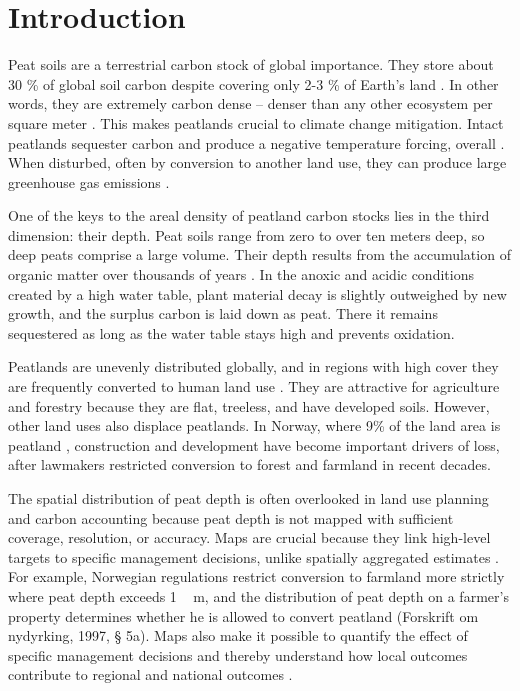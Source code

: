 \documentclass[soil, manuscript]{copernicus}
\begin{document}
\section{Introduction}

Peat soils are a terrestrial carbon stock of global importance.
They store about 30 \% of global soil carbon despite covering only 2-3 \% of Earth's land \citep{xuPEATMAPRefiningEstimates2018, friedlingsteinGlobalCarbonBudget2020, unepGlobalPeatlandsAssessment2022}.
In other words, they are extremely carbon dense -- denser than any other ecosystem per square meter \citep{temminkRecoveringWetlandBiogeomorphic2022}.
This makes peatlands crucial to climate change mitigation.
Intact peatlands sequester carbon and produce a negative temperature forcing, overall \citep{joostenRolePeatlandsClimate2016}.
When disturbed, often by conversion to another land use, they can produce large greenhouse gas emissions \citep{maGloballyRobustRelationship2022}.

One of the keys to the areal density of peatland carbon stocks lies in the third dimension: their depth.
Peat soils range from zero to over ten meters deep, so deep peats comprise a large volume.
Their depth results from the accumulation of organic matter over thousands of years \citep{loiselDatabaseSynthesisNorthern2014, joostenRolePeatlandsClimate2016}.
In the anoxic and acidic conditions created by a high water table, plant material decay is slightly outweighed by new growth, and the surplus carbon is laid down as peat.
There it remains sequestered as long as the water table stays high and prevents oxidation.

Peatlands are unevenly distributed globally, and in regions with high cover they are frequently converted to human land use \citep{unepGlobalPeatlandsAssessment2022}.
They are attractive for agriculture and forestry because they are flat, treeless, and have developed soils.
However, other land uses also displace peatlands.
In Norway, where 9\% of the land area is peatland \citep{brynLandCoverNorway2018}, construction and development have become important drivers of loss, after lawmakers restricted conversion to forest and farmland in recent decades.

The spatial distribution of peat depth is often overlooked in land use planning and carbon accounting because peat depth is not mapped with sufficient coverage, resolution, or accuracy.
Maps are crucial because they link high-level targets to specific management decisions, unlike spatially aggregated estimates \citep{oecdOECDEnvironmentalPerformance2022}.
For example, Norwegian regulations restrict conversion to farmland more strictly where peat depth exceeds \unit{1\,m}, and the distribution of peat depth on a farmer's property determines whether he is allowed to convert peatland (Forskrift om nydyrking, 1997, § 5a).
Maps also make it possible to quantify the effect of specific management decisions and thereby understand how local outcomes contribute to regional and national outcomes \citep{oecdOECDEnvironmentalPerformance2022}.
\end{document}
